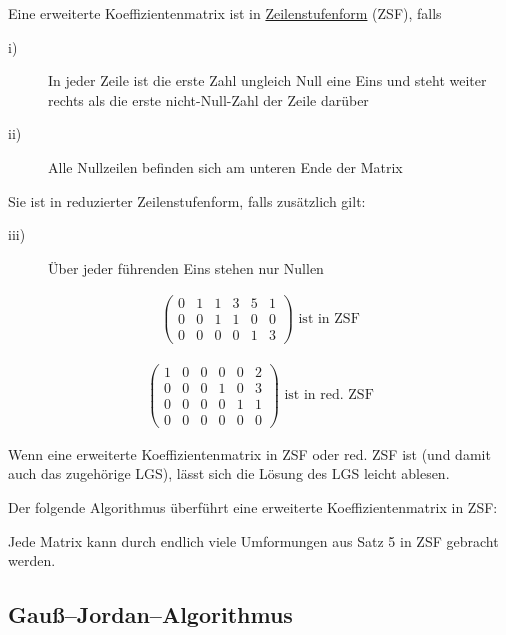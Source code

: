 Eine erweiterte Koeffizientenmatrix ist in \underline{Zeilenstufenform} (ZSF), falls

\begin{description}
\item[i)]{In jeder Zeile ist die erste Zahl ungleich Null eine Eins und steht weiter rechts als die erste nicht-Null-Zahl der Zeile darüber}
\item[ii)]{Alle Nullzeilen befinden sich am unteren Ende der Matrix}
\end{description}
Sie ist in reduzierter Zeilenstufenform, falls zusätzlich gilt:
\begin{description}
\item[iii)]{Über jeder führenden Eins stehen nur Nullen}
\end{description}

\begin{align*}
    \left(\begin{array}{ccccc|c}
        0 & 1 & 1 & 3 & 5 & 1 \\
        0 & 0 & 1 & 1 & 0 & 0 \\
        0 & 0 & 0 & 0 & 1 & 3
    \end{array}\right) \text{ ist in ZSF}
\end{align*}

\begin{align*}
    \left(\begin{array}{ccccc|c}
        1 & 0 & 0 & 0 & 0 & 2 \\
        0 & 0 & 0 & 1 & 0 & 3 \\
        0 & 0 & 0 & 0 & 1 & 1 \\
        0 & 0 & 0 & 0 & 0 & 0
    \end{array}\right) \text{ ist in red. ZSF}
\end{align*}

Wenn eine erweiterte Koeffizientenmatrix in ZSF oder red. ZSF ist (und damit auch das zugehörige LGS), lässt sich die Lösung des LGS leicht ablesen.

Der folgende Algorithmus überführt eine erweiterte Koeffizientenmatrix in ZSF:

Jede Matrix kann durch endlich viele Umformungen aus Satz 5 in ZSF gebracht werden.

\subsection{Gauß--Jordan--Algorithmus}

